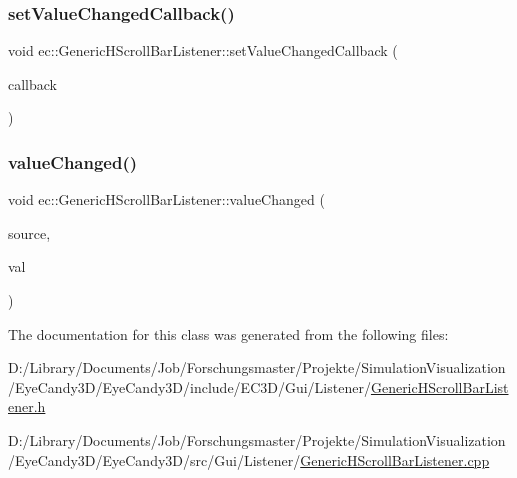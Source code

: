 \subsubsection{\texorpdfstring{set\+Value\+Changed\+Callback()}{setValueChangedCallback()}}
{\footnotesize\ttfamily void ec\+::\+Generic\+H\+Scroll\+Bar\+Listener\+::set\+Value\+Changed\+Callback (\begin{DoxyParamCaption}\item[{const \mbox{\hyperlink{classec_1_1_generic_h_scroll_bar_listener_ad02a375c4835a99a41bcd97b6a408637}{Value\+Changed\+\_\+\+Callback}} \&}]{callback }\end{DoxyParamCaption})}

\mbox{\label{classec_1_1_generic_h_scroll_bar_listener_a7c55d42a9623801361988a153d5d2d6d}} 
\subsubsection{\texorpdfstring{value\+Changed()}{valueChanged()}}
{\footnotesize\ttfamily void ec\+::\+Generic\+H\+Scroll\+Bar\+Listener\+::value\+Changed (\begin{DoxyParamCaption}\item[{agui\+::\+H\+Scroll\+Bar $\ast$}]{source,  }\item[{int}]{val }\end{DoxyParamCaption})\hspace{0.3cm}{\ttfamily [override]}}



The documentation for this class was generated from the following files\+:\begin{DoxyCompactItemize}
\item 
D\+:/\+Library/\+Documents/\+Job/\+Forschungsmaster/\+Projekte/\+Simulation\+Visualization/\+Eye\+Candy3\+D/\+Eye\+Candy3\+D/include/\+E\+C3\+D/\+Gui/\+Listener/\mbox{\hyperlink{_generic_h_scroll_bar_listener_8h}{Generic\+H\+Scroll\+Bar\+Listener.\+h}}\item 
D\+:/\+Library/\+Documents/\+Job/\+Forschungsmaster/\+Projekte/\+Simulation\+Visualization/\+Eye\+Candy3\+D/\+Eye\+Candy3\+D/src/\+Gui/\+Listener/\mbox{\hyperlink{_generic_h_scroll_bar_listener_8cpp}{Generic\+H\+Scroll\+Bar\+Listener.\+cpp}}\end{DoxyCompactItemize}
